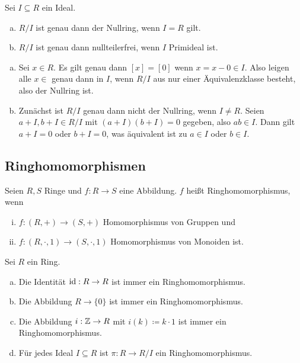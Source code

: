 \begin{lemma}
  Sei \(I\subseteq R\) ein Ideal.
  \begin{enumerate}[(a)]
  \item \(R/I\) ist genau dann der Nullring, wenn \(I=R\) gilt.
  \item \(R/I\) ist genau dann nullteilerfrei, wenn \(I\) Primideal ist.
  \end{enumerate}
\end{lemma}

\begin{beweis}
  \begin{enumerate}[(a)]
  \item Sei \(x\in R\).
    Es gilt genau dann \([x]=[0]\) wenn \(x=x-0\in I\).
    Also leigen alle \(x\in \) genau dann in \(I\),
    wenn \(R/I\) aus nur einer Äquivalenzklasse besteht, also der Nullring ist.
  \item Zunächst ist \(R/I\) genau dann nicht der Nullring, wenn \(I\neq R\).
  Seien \(a+I,b+I\in R/I\) mit \((a+I)(b+I)=0\) gegeben, also \(ab\in I\).
  Dann gilt \(a+I=0\) oder \(b+I=0\), was äquivalent ist zu \(a\in I\) oder \(b\in I\).
  \end{enumerate}
\end{beweis}


\subsection{Ringhomomorphismen}

\begin{definition}
  Seien \(R,S\) Ringe und \(f:R\to S\) eine Abbildung.
  \(f\) heißt Ringhomomorphismus, wenn
  \begin{enumerate}[(i)]
  \item \(f:(R,+)\to (S,+)\) Homomorphismus von Gruppen und
  \item \(f:(R,\cdot,1)\to (S,\cdot,1)\) Homomorphismus von Monoiden ist.
  \end{enumerate}
\end{definition}

\begin{beispiel}
  Sei \(R\) ein Ring.
  \begin{enumerate}[(a)]
  \item Die Identität \(\mathrm{id}:R\to R\) ist immer ein Ringhomomorphismus.
  \item Die Abbildung \(R\to \{0\}\) ist immer ein Ringhomomorphismus.
  \item Die Abbildung \(i:\mathbb{Z}\to R\) mit \(i(k)\coloneq k\cdot 1\) ist immer ein Ringhomomorphismus. 
  \item Für jedes Ideal \(I\subseteq R\) ist \(\pi:R\to R/I\) ein Ringhomomorphismus.
  \end{enumerate}
\end{beispiel}

